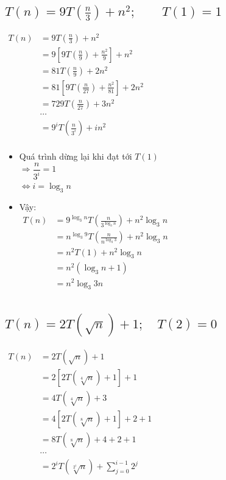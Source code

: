 \documentclass[12pt, letterpaper]{article}
\begin{document}
\subsection{$ T(n) = 9T(\frac{n}{3}) + n^2; \quad \quad T(1) = 1 $}
$ \begin{aligned}
		T(n) & = 9T(\frac{n}{3}) + n^2                        \\
		     & = 9[9T(\frac{n}{9}) + \frac{n^2}{9}] + n^2     \\
		     & = 81T(\frac{n}{9}) + 2n^2                      \\
		     & = 81[9T(\frac{n}{27}) + \frac{n^2}{81}] + 2n^2 \\
		     & = 729 T(\frac{n}{27}) + 3n^2                   \\
		     & \cdots                                         \\
		     & = 9^i T(\frac{n}{3^i}) + in^2                  \\
	\end{aligned} $

\begin{itemize}[label=-]
	\item Quá trình dừng lại khi đạt tới $ T(1) $ \\
	      $ \Rightarrow \dfrac{n}{3^i} = 1 $ \\
	      $ \Leftrightarrow i = \log_3n $
	\item Vậy:\\
	      $ \begin{aligned}
			      T(n) & = 9^{\log_3n} T(\frac{n}{3^{\log_3n}}) + n^2{\log_3n}   \\
			           & = n^{\log_3 9} T(\frac{n}{n^{\log_3 3}}) + n^2{\log_3n} \\
			           & = n^2 T(1) + n^2{\log_3n}                               \\
			           & = n^2 (\log_3 n + 1)                                    \\
			           & = n^2 \log_3 3n                                         \\
		      \end{aligned} $
\end{itemize}

\subsection{$ T(n) = 2T(\sqrt{n}) + 1; \quad T(2) = 0 $}
$ \begin{aligned}
		T(n) & = 2T(\sqrt{n}) + 1                                \\
		     & = 2[2T(\sqrt[4]{n}) + 1] + 1                      \\
		     & = 4T(\sqrt[4]{n}) + 3                             \\
		     & = 4[2T(\sqrt[8]{n}) + 1] + 2 + 1                  \\
		     & = 8T(\sqrt[8]{n}) + 4 + 2 + 1                     \\
		     & \cdots                                            \\
		     & = 2^{i}T(\sqrt[2^i]{n}) + \sum_{j = 0}^{i - 1}2^j \\
	\end{aligned} $
\end{document}
